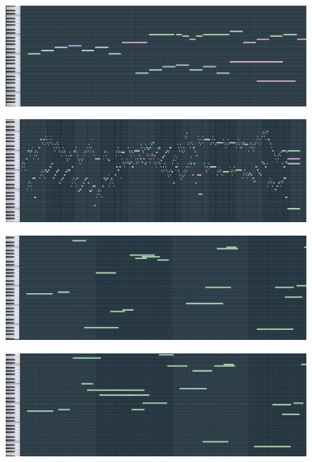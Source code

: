 \documentclass[conference]{IEEEtran}
\begin{document}
\begin{figure}
\centering
\begin{minipage}{.5\textwidth}
  \centering
  \includegraphics[width=.9\linewidth]{corpus-5.png}
  \label{fig:test1}
\end{minipage}%
\begin{minipage}{.5\textwidth}
  \centering
  \includegraphics[width=.9\linewidth]{corpus-full.png}
  \label{fig:test2}
\end{minipage}

\centering
\begin{minipage}{.5\textwidth}
  \centering
  \includegraphics[width=.9\linewidth]{fitness1-first-30.png}
  \label{fig:test1}
\end{minipage}%
\begin{minipage}{.5\textwidth}
  \centering
  \includegraphics[width=.9\linewidth]{fitness1-final-30.png}
  \label{fig:test2}
\end{minipage}


\end{figure}
\end{document}
